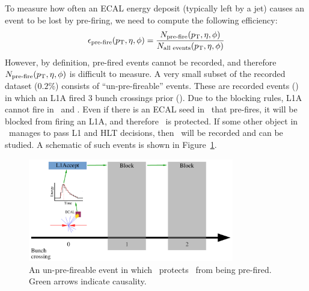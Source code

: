 To measure how often an ECAL energy deposit (typically left by a jet) causes an event to be lost by pre-firing, we need to compute the following efficiency:
\begin{equation}
    \epsilon_\text{pre-fire}(p_\mathrm{T},\eta,\phi) = \frac{N_\text{pre-fire}(p_\mathrm{T},\eta,\phi)}{N_\text{all events}(p_\mathrm{T},\eta,\phi)}
\end{equation}
However, by definition, pre-fired events cannot be recorded, and therefore $N_\text{pre-fire}(p_\mathrm{T},\eta,\phi)$ is difficult to measure.
A very small subset of the recorded dataset ($0.2\%$) consists of ``un-pre-fireable'' events.
These are recorded events () in which an L1A fired 3 bunch crossings prior ().
Due to the blocking rules, L1A cannot fire in ~and .
Even if there is an ECAL seed in ~that pre-fires, it will be blocked from firing an L1A, and therefore ~is protected.
If some other object in ~manages to pass L1 and HLT decisions, then ~will be recorded and can be studied.
A schematic of such events is shown in Figure~\ref{fig:vbf:pre3}.

\begin{figure}
    \begin{center}
        \includegraphics[width=0.8\textwidth,page=3]{figures/vbf/triggers/l1diag.pdf}
        \caption{An un-pre-fireable event in which ~protects ~from being pre-fired. 
                 Green arrows indicate causality.}
        \label{fig:vbf:pre3}
    \end{center}
\end{figure}

